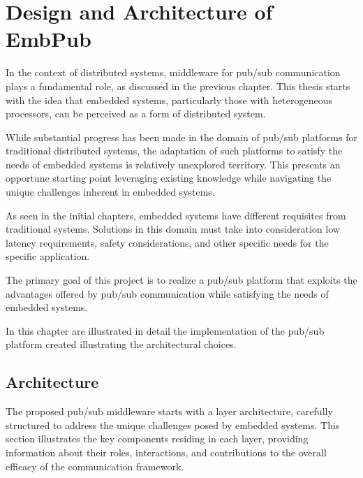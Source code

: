 

\chapter{Design and Architecture of EmbPub}

In the context of distributed systems, middleware for pub/sub communication
plays a fundamental role, as discussed in the previous chapter. This thesis
starts with the idea that embedded systems, particularly those with
heterogeneous processors, can be perceived as a form of distributed system.

While substantial progress has been made in the domain of pub/sub platforms for
traditional distributed systems, the adaptation of such platforms to satisfy
the needs of embedded systems is relatively unexplored territory.
This presents an opportune starting point leveraging existing knowledge while
navigating the unique challenges inherent in embedded systems.

As seen in the initial chapters, embedded systems have different requisites
from traditional systems.
Solutions in this domain must take into consideration low latency requirements,
safety considerations, and other specific needs for the specific application.

The primary goal of this project is to realize a pub/sub platform that exploits
the advantages offered by pub/sub communication while satisfying the needs of
embedded systems.

In this chapter are illustrated in detail the implementation of the pub/sub
platform created illustrating the architectural choices.

\section{Architecture}

The proposed pub/sub middleware starts with a layer architecture, carefully
structured to address the unique challenges posed by embedded systems. This
section illustrates the key components residing in each layer, providing
information about their roles, interactions, and contributions to the overall
efficacy of the communication framework.


